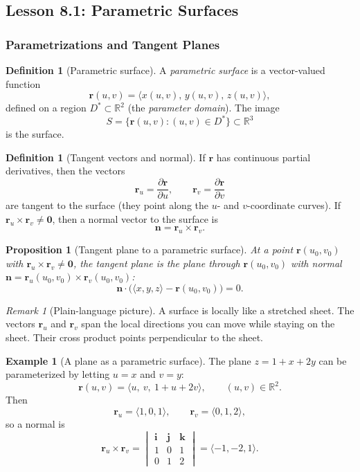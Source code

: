 \documentclass[12pt]{article}
\numberwithin{equation}{section}
\newcommand{\RR}{\mathbb{R}}
\newcommand{\vect}[1]{\boldsymbol{#1}}   %
\theoremstyle{plain}
\newtheorem{proposition}[theorem]{Proposition}
\theoremstyle{definition}
\newtheorem{definition}[theorem]{Definition}
\newtheorem{example}[theorem]{Example}
\theoremstyle{remark}
\newtheorem{remark}[theorem]{Remark}
\begin{document}
\subsection{Lesson 8.1: Parametric Surfaces}

\subsubsection{Parametrizations and Tangent Planes}

\begin{definition}[Parametric surface]\label{def:param-surface}
A \emph{parametric surface} is a vector-valued function
\[
\vect r(u,v)=\langle x(u,v),\,y(u,v),\,z(u,v)\rangle,
\]
defined on a region $D^\ast\subset \RR^2$ (the \emph{parameter domain}). The image
\[
S=\{\vect r(u,v):(u,v)\in D^\ast\}\subset\RR^3
\]
is the surface.
\end{definition}

\begin{definition}[Tangent vectors and normal]\label{def:tangent-normal}
If $\vect r$ has continuous partial derivatives, then the vectors
\[
\vect r_u=\frac{\partial \vect r}{\partial u},\qquad \vect r_v=\frac{\partial \vect r}{\partial v}
\]
are tangent to the surface (they point along the $u$- and $v$-coordinate curves).  
If $\vect r_u\times \vect r_v\neq \vect 0$, then a normal vector to the surface is
\[
\vect n = \vect r_u\times \vect r_v.
\]
\end{definition}

\begin{proposition}[Tangent plane to a parametric surface]\label{prop:tangent-plane-param}
At a point $\vect r(u_0,v_0)$ with $\vect r_u\times \vect r_v\neq\vect 0$, the tangent plane is the plane through $\vect r(u_0,v_0)$ with normal $\vect n=\vect r_u(u_0,v_0)\times \vect r_v(u_0,v_0)$:
\[
\vect n\cdot\bigl(\langle x,y,z\rangle-\vect r(u_0,v_0)\bigr)=0.
\]
\end{proposition}

\begin{remark}[Plain-language picture]
A surface is locally like a stretched sheet. The vectors $\vect r_u$ and $\vect r_v$ span the local directions you can move while staying on the sheet. Their cross product points perpendicular to the sheet.
\end{remark}

\begin{example}[A plane as a parametric surface]\label{ex:param-plane}
The plane $z=1+x+2y$ can be parameterized by letting $u=x$ and $v=y$:
\[
\vect r(u,v)=\langle u,\ v,\ 1+u+2v\rangle,\qquad (u,v)\in\RR^2.
\]
Then
\[
\vect r_u=\langle 1,0,1\rangle,\qquad \vect r_v=\langle 0,1,2\rangle,
\]
so a normal is
\[
\vect r_u\times\vect r_v=
\begin{vmatrix}
\vect i & \vect j & \vect k\\
1&0&1\\
0&1&2
\end{vmatrix}
=\langle -1,-2,1\rangle.
\]
\end{example}
\end{document}
